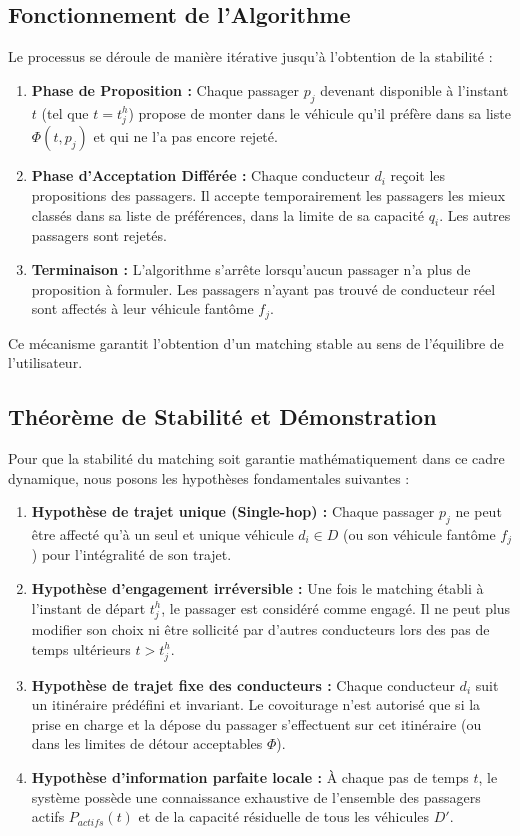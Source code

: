 \documentclass[12pt, a4paper]{article}
\begin{document}
\subsection{Fonctionnement de l'Algorithme}
Le processus se déroule de manière itérative jusqu'à l'obtention de la stabilité :
\begin{enumerate}
    \item \textbf{Phase de Proposition :} Chaque passager $p_j$ devenant disponible à l'instant $t$ (tel que $t = t^h_j$) propose de monter dans le véhicule qu'il préfère dans sa liste $\Phi(t, p_j)$ et qui ne l'a pas encore rejeté.
    \item \textbf{Phase d'Acceptation Différée :} Chaque conducteur $d_i$ reçoit les propositions des passagers. Il accepte temporairement les passagers les mieux classés dans sa liste de préférences, dans la limite de sa capacité $q_i$. Les autres passagers sont rejetés.
    \item \textbf{Terminaison :} L'algorithme s'arrête lorsqu'aucun passager n'a plus de proposition à formuler. Les passagers n'ayant pas trouvé de conducteur réel sont affectés à leur véhicule fantôme $f_j$.
\end{enumerate}
Ce mécanisme garantit l'obtention d'un matching stable au sens de l'équilibre de l'utilisateur.

\subsection{Théorème de Stabilité et Démonstration}
Pour que la stabilité du matching soit garantie mathématiquement dans ce cadre dynamique, nous posons les hypothèses fondamentales suivantes :
\begin{enumerate}
    \item \textbf{Hypothèse de trajet unique (Single-hop) :} Chaque passager $p_j$ ne peut être affecté qu'à un seul et unique véhicule $d_i \in D$ (ou son véhicule fantôme $f_j$) pour l'intégralité de son trajet.
    \item \textbf{Hypothèse d'engagement irréversible :} Une fois le matching établi à l'instant de départ $t^h_j$, le passager est considéré comme engagé. Il ne peut plus modifier son choix ni être sollicité par d'autres conducteurs lors des pas de temps ultérieurs $t > t^h_j$.
    \item \textbf{Hypothèse de trajet fixe des conducteurs :} Chaque conducteur $d_i$ suit un itinéraire prédéfini et invariant. Le covoiturage n'est autorisé que si la prise en charge et la dépose du passager s'effectuent sur cet itinéraire (ou dans les limites de détour acceptables $\Phi$).
    \item \textbf{Hypothèse d'information parfaite locale :} À chaque pas de temps $t$, le système possède une connaissance exhaustive de l'ensemble des passagers actifs $P_{actifs}(t)$ et de la capacité résiduelle de tous les véhicules $D'$.
\end{enumerate}
\end{document}
